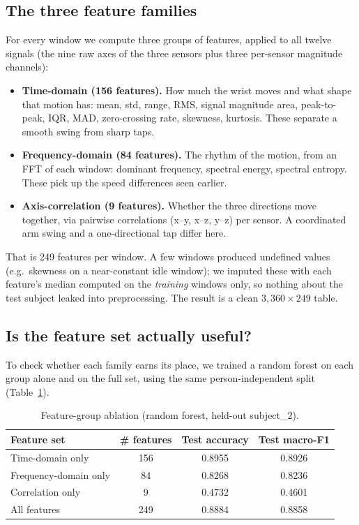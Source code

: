 \documentclass[runningheads]{llncs}
\begin{document}
\subsection{The three feature families}
For every window we compute three groups of features, applied to all twelve signals (the nine raw axes of the three sensors plus three per-sensor magnitude channels):
\begin{itemize}
  \item \textbf{Time-domain (156 features).} How much the wrist moves and what shape that motion has: mean, std, range, RMS, signal magnitude area, peak-to-peak, IQR, MAD, zero-crossing rate, skewness, kurtosis. These separate a smooth swing from sharp taps.
  \item \textbf{Frequency-domain (84 features).} The rhythm of the motion, from an FFT of each window: dominant frequency, spectral energy, spectral entropy. These pick up the speed differences seen earlier.
  \item \textbf{Axis-correlation (9 features).} Whether the three directions move together, via pairwise correlations (x--y, x--z, y--z) per sensor. A coordinated arm swing and a one-directional tap differ here.
\end{itemize}
That is 249 features per window. A few windows produced undefined values (e.g.\ skewness on a near-constant idle window); we imputed these with each feature's median computed on the \emph{training} windows only, so nothing about the test subject leaked into preprocessing. The result is a clean $3{,}360 \times 249$ table.

\subsection{Is the feature set actually useful?}
To check whether each family earns its place, we trained a random forest on each group alone and on the full set, using the same person-independent split (Table~\ref{tab:ablation}).

\begin{table}[ht]
\caption{Feature-group ablation (random forest, held-out subject\_2).}
\label{tab:ablation}
\centering\small
\begin{tabular}{lccc}
\toprule
\textbf{Feature set} & \textbf{\# features} & \textbf{Test accuracy} & \textbf{Test macro-F1} \\
\midrule
Time-domain only      & 156 & 0.8955 & 0.8926 \\
Frequency-domain only & 84  & 0.8268 & 0.8236 \\
Correlation only      & 9   & 0.4732 & 0.4601 \\
All features          & 249 & 0.8884 & 0.8858 \\
\bottomrule
\end{tabular}
\end{table}
\end{document}
